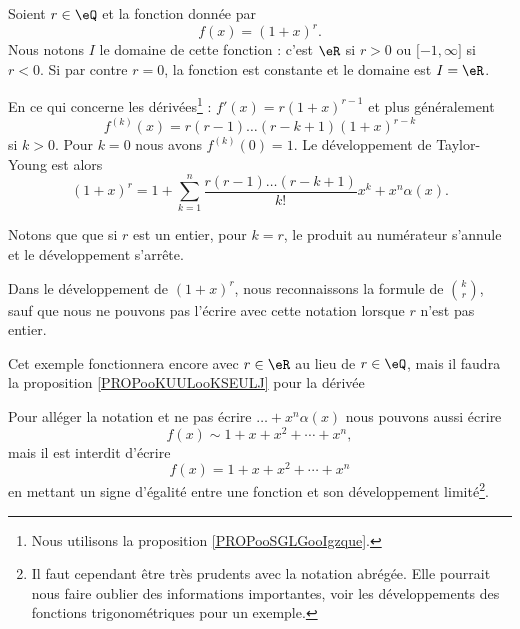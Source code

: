 \begin{example}     \label{EXooFLBJooYfuRsG}
    Soient \( r\in \eQ\) et la fonction donnée par
    \begin{equation}
        f(x)=(1+x)^r.
    \end{equation}
    Nous notons \( I\) le domaine de cette fonction : c'est \( \eR\) si \( r>0\) ou \( \mathopen[ -1 , \infty \mathclose]\) si \( r<0\). Si par contre \( r=0\), la fonction est constante et le domaine est \( I=\eR\).

    En ce qui concerne les dérivées\footnote{Nous utilisons la proposition \ref{PROPooSGLGooIgzque}.} : \( f'(x)=r(1+x)^{r-1}\) et plus généralement
    \begin{equation}
        f^{(k)}(x)=r(r-1)\ldots (r-k+1)(1+x)^{r-k}
    \end{equation}
    si \( k>0\). Pour \( k=0\) nous avons \( f^{(k)}(0)=1\). Le développement de Taylor-Young est alors
    \begin{equation}
      (1+x)^r=1+\sum_{k=1}^n\frac{r(r-1)\ldots (r-k+1)}{ k! }x^k+x^n\alpha(x).
    \end{equation}
    
    Notons que que si \( r\) est un entier, pour \( k=r\), le produit au numérateur s'annule et le développement s'arrête. 
    
    Dans le développement de \( (1+x)^{r}\), nous reconnaissons la formule de \( \binom{ k }{r}\), sauf que nous ne pouvons pas l'écrire avec cette notation lorsque \( r\) n'est pas entier.
\end{example}
Cet exemple fonctionnera encore avec \( r\in \eR\) au lieu de \( r\in \eQ\), mais il faudra la proposition \ref{PROPooKUULooKSEULJ} pour la dérivée

\begin{remark}
  Pour alléger la notation et ne pas écrire \(\ldots +x^n\alpha(x)\) nous pouvons aussi écrire
    \begin{equation}
         f(x)\sim 1+x+x^2+\cdots +x^n,
    \end{equation}
    mais il est interdit d'écrire
    \begin{equation}
         f(x)= 1+x+x^2+\cdots +x^n
    \end{equation}
    en mettant un signe d'égalité entre une fonction et son développement limité\footnote{Il faut cependant être très prudents avec la notation abrégée. Elle pourrait nous faire oublier des informations importantes, voir les développements des fonctions trigonométriques pour un exemple.}.
\end{remark}

